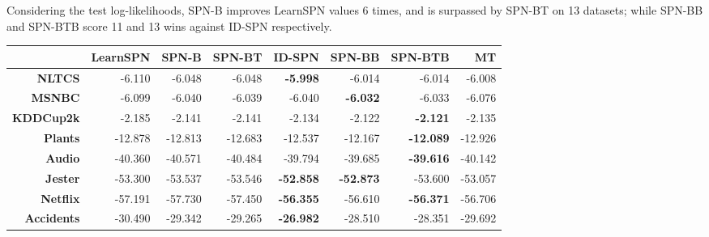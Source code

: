 \documentclass[final]{beamer}
\begin{document}
\begin{frame}{}
\begin{textblock}{25.2}
    Considering the test log-likelihoods, \textsf{SPN-B} improves
    \textsf{LearnSPN} values 6 times, and is surpassed by \textsf{SPN-BT} on 13
    datasets; while \textsf{SPN-BB} and
    \textsf{SPN-BTB} score 11 and 13 wins against \textsf{ID-SPN} respectively.\par\bigskip
    




      \begin{table}[!htbp]
        \centering
        \scriptsize
        \setlength{\tabcolsep}{3pt}  
        \begin{tabular}{r r r r r r r r}
          \toprule
          & \textsf{LearnSPN} & \textsf{SPN-B} & \textsf{SPN-BT} & \textsf{ID-SPN}  & \textsf{SPN-BB}   & \textsf{SPN-BTB}  & \textsf{MT}      \\
          \midrule                                                                                     
          \textbf{NLTCS}      & -6.110            & -6.048         & -6.048          & \textbf{-5.998}  & -6.014            & -6.014            & -6.008           \\
          \textbf{MSNBC}      & -6.099            & -6.040         & -6.039          & -6.040           & \textbf{-6.032}   & -6.033            & -6.076           \\
          \textbf{KDDCup2k}   & -2.185            & -2.141         & -2.141          & -2.134           & -2.122            & \textbf{-2.121}   & -2.135           \\
          \textbf{Plants}     & -12.878           & -12.813        & -12.683         & -12.537          & -12.167           & \textbf{-12.089}  & -12.926          \\
          \textbf{Audio}      & -40.360           & -40.571        & -40.484         & -39.794          & -39.685           & \textbf{-39.616}  & -40.142          \\
          \textbf{Jester}     & -53.300           & -53.537        & -53.546         & \textbf{-52.858} & \textbf{-52.873}  & -53.600           & -53.057          \\
          \textbf{Netflix}    & -57.191           & -57.730        & -57.450         & \textbf{-56.355} & -56.610           & \textbf{-56.371}  & -56.706          \\
          \textbf{Accidents}  & -30.490           & -29.342        & -29.265         & \textbf{-26.982} & -28.510           & -28.351           & -29.692          \\

\end{tabular}
\end{table}
\end{textblock}
\end{frame}
\end{document}
